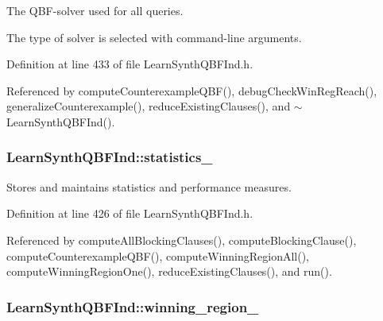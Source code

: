 The Q\-B\-F-\/solver used for all queries. 

The type of solver is selected with command-\/line arguments. 

Definition at line 433 of file Learn\-Synth\-Q\-B\-F\-Ind.\-h.



Referenced by compute\-Counterexample\-Q\-B\-F(), debug\-Check\-Win\-Reg\-Reach(), generalize\-Counterexample(), reduce\-Existing\-Clauses(), and $\sim$\-Learn\-Synth\-Q\-B\-F\-Ind().

\hypertarget{classLearnSynthQBFInd_af83f4253aeedaed56cb789369b054724}{
\subsubsection[{statistics\-\_\-}]{ Learn\-Synth\-Q\-B\-F\-Ind\-::statistics\-\_\-\hspace{0.3cm}{\ttfamily [protected]}}}\label{classLearnSynthQBFInd_af83f4253aeedaed56cb789369b054724}


Stores and maintains statistics and performance measures. 



Definition at line 426 of file Learn\-Synth\-Q\-B\-F\-Ind.\-h.



Referenced by compute\-All\-Blocking\-Clauses(), compute\-Blocking\-Clause(), compute\-Counterexample\-Q\-B\-F(), compute\-Winning\-Region\-All(), compute\-Winning\-Region\-One(), reduce\-Existing\-Clauses(), and run().

\hypertarget{classLearnSynthQBFInd_ab8ce6031137413e90e0626bbdc734be0}{
\subsubsection[{winning\-\_\-region\-\_\-}]{ Learn\-Synth\-Q\-B\-F\-Ind\-::winning\-\_\-region\-\_\-\hspace{0.3cm}{\ttfamily [protected]}}}\label{classLearnSynthQBFInd_ab8ce6031137413e90e0626bbdc734be0}



